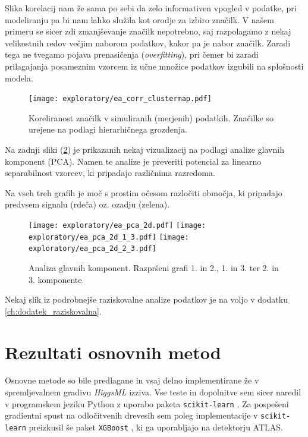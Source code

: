 \documentclass[11pt,a4paper,openany]{book}
\begin{document}
Slika korelacij nam že sama po sebi da zelo informativen vpogled v podatke, pri modeliranju pa bi nam lahko služila kot orodje za izbiro značilk. V našem primeru se sicer zdi zmanjševanje značilk nepotrebno, saj razpolagamo z nekaj velikostnih redov večjim naborom podatkov, kakor pa je nabor značilk. Zaradi tega ne tvegamo pojava prenasičenja (\textit{overfitting}), pri čemer bi zaradi prilagajanja posameznim vzorcem iz učne množice podatkov izgubili na splošnosti modela.

\begin{figure}[ht]
	\centering
	\texttt{[image: exploratory/ea\_corr\_clustermap.pdf]}
	\caption{Koreliranost značilk v simuliranih (merjenih) podatkih. Značilke so urejene na podlagi hierarhičnega grozdenja.}
	\label{sl:corr_clust_matrix}
\end{figure}

Na zadnji sliki (\ref{sl:pca}) je prikazanih nekaj vizualizacij na podlagi analize glavnih komponent (PCA). Namen te analize je preveriti potencial za linearno separabilnost vzorcev, ki pripadajo različnima razredoma. 


Na vseh treh grafih je moč s prostim očesom razločiti območja, ki pripadajo predvsem signalu (rdeča) oz. ozadju (zelena).

\begin{figure}[h]	
	\texttt{[image: exploratory/ea\_pca\_2d.pdf]}
	\texttt{[image: exploratory/ea\_pca\_2d\_1\_3.pdf]}
	\texttt{[image: exploratory/ea\_pca\_2d\_2\_3.pdf]}		
	
	\caption{Analiza glavnih komponent. Razpršeni grafi 1. in 2., 1. in 3. ter 2. in 3. komponente.}
	\label{sl:pca}
\end{figure}

Nekaj slik iz podrobnejše raziskovalne analize podatkov je na voljo v dodatku \ref{ch:dodatek_raziskovalna}.

	
\chapter{Rezultati osnovnih metod}

Osnovne metode so bile predlagane in vsaj delno implementirane že v spremljevalnem gradivu \textit{HiggsML} izziva. Vse teste in dopolnitve sem sicer naredil v programskem jeziku Python z uporabo paketa \texttt{scikit-learn} \cite{scikit-learn}. Za pospešeni gradientni spust na odločitvenih drevesih sem poleg implementacije v \texttt{scikit-learn} preizkusil še paket \texttt{XGBoost} \cite{chen2014}, ki ga uporabljajo na detektorju ATLAS.
\end{document}
